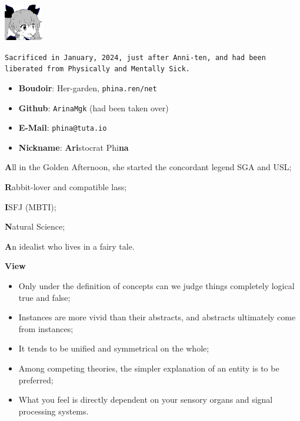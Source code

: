 
\includegraphics{../../../.picture/phina.head.bmp}


\verb|Sacrificed in January, 2024, just after Anni-ten, and had been liberated from Physically and Mentally Sick.|

\begin{itemize}
	\item \textbf{Boudoir}: Her-garden, \texttt{phina.ren/net}
	\item \textbf{Github}: \verb|ArinaMgk| (had been taken over)
	\item \textbf{E-Mail}: \verb|phina@tuta.io|
	\item \textbf{Nickname}: \textbf{Ari}stocrat Phi\textbf{na}
\end{itemize}


\textbf{A}ll in the Golden Afternoon\cite{AliceWonderland}, she started the concordant legend \textemdash{} SGA and USL;

\textbf{R}abbit-lover and compatible lass;

\textbf{I}SFJ (MBTI);

\textbf{N}atural Science;

\textbf{A}n idealist who lives in a fairy tale.

\textbf{View}
\begin{itemize}
	\item Only under the definition of concepts can we judge things completely logical true and false;
	\item Instances are more vivid than their abstracts, and abstracts ultimately come from instances;
	\item It tends to be unified and symmetrical on the whole;
	\item Among competing theories, the simpler explanation of an entity is to be preferred;
	\item What you feel is directly dependent on your sensory organs and signal processing systems.
\end{itemize}

